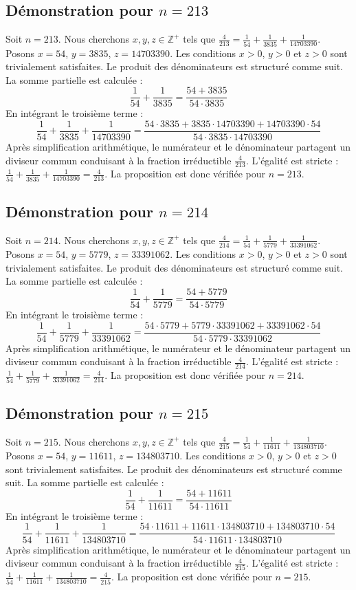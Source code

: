 \documentclass[11pt,a4paper]{article}
\begin{document}
\subsection{Démonstration pour $n = 213$}
Soit $n = 213$. Nous cherchons $x, y, z \in \mathbb{Z}^{+}$ tels que $\frac{4}{213} = \frac{1}{54} + \frac{1}{3835} + \frac{1}{14703390}$.
Posons $x = 54$, $y = 3835$, $z = 14703390$.
Les conditions $x > 0$, $y > 0$ et $z > 0$ sont trivialement satisfaites.
Le produit des dénominateurs est structuré comme suit. La somme partielle est calculée :
$$ \frac{1}{54} + \frac{1}{3835} = \frac{54+3835}{54 \cdot 3835} $$
En intégrant le troisième terme :
$$ \frac{1}{54} + \frac{1}{3835} + \frac{1}{14703390} = \frac{54 \cdot 3835 + 3835 \cdot 14703390 + 14703390 \cdot 54}{54 \cdot 3835 \cdot 14703390} $$
Après simplification arithmétique, le numérateur et le dénominateur partagent un diviseur commun conduisant à la fraction irréductible $\frac{4}{213}$.
L'égalité est stricte : $\frac{1}{54} + \frac{1}{3835} + \frac{1}{14703390} = \frac{4}{213}$.
La proposition est donc vérifiée pour $n = 213$.
\subsection{Démonstration pour $n = 214$}
Soit $n = 214$. Nous cherchons $x, y, z \in \mathbb{Z}^{+}$ tels que $\frac{4}{214} = \frac{1}{54} + \frac{1}{5779} + \frac{1}{33391062}$.
Posons $x = 54$, $y = 5779$, $z = 33391062$.
Les conditions $x > 0$, $y > 0$ et $z > 0$ sont trivialement satisfaites.
Le produit des dénominateurs est structuré comme suit. La somme partielle est calculée :
$$ \frac{1}{54} + \frac{1}{5779} = \frac{54+5779}{54 \cdot 5779} $$
En intégrant le troisième terme :
$$ \frac{1}{54} + \frac{1}{5779} + \frac{1}{33391062} = \frac{54 \cdot 5779 + 5779 \cdot 33391062 + 33391062 \cdot 54}{54 \cdot 5779 \cdot 33391062} $$
Après simplification arithmétique, le numérateur et le dénominateur partagent un diviseur commun conduisant à la fraction irréductible $\frac{4}{214}$.
L'égalité est stricte : $\frac{1}{54} + \frac{1}{5779} + \frac{1}{33391062} = \frac{4}{214}$.
La proposition est donc vérifiée pour $n = 214$.
\subsection{Démonstration pour $n = 215$}
Soit $n = 215$. Nous cherchons $x, y, z \in \mathbb{Z}^{+}$ tels que $\frac{4}{215} = \frac{1}{54} + \frac{1}{11611} + \frac{1}{134803710}$.
Posons $x = 54$, $y = 11611$, $z = 134803710$.
Les conditions $x > 0$, $y > 0$ et $z > 0$ sont trivialement satisfaites.
Le produit des dénominateurs est structuré comme suit. La somme partielle est calculée :
$$ \frac{1}{54} + \frac{1}{11611} = \frac{54+11611}{54 \cdot 11611} $$
En intégrant le troisième terme :
$$ \frac{1}{54} + \frac{1}{11611} + \frac{1}{134803710} = \frac{54 \cdot 11611 + 11611 \cdot 134803710 + 134803710 \cdot 54}{54 \cdot 11611 \cdot 134803710} $$
Après simplification arithmétique, le numérateur et le dénominateur partagent un diviseur commun conduisant à la fraction irréductible $\frac{4}{215}$.
L'égalité est stricte : $\frac{1}{54} + \frac{1}{11611} + \frac{1}{134803710} = \frac{4}{215}$.
La proposition est donc vérifiée pour $n = 215$.
\end{document}
